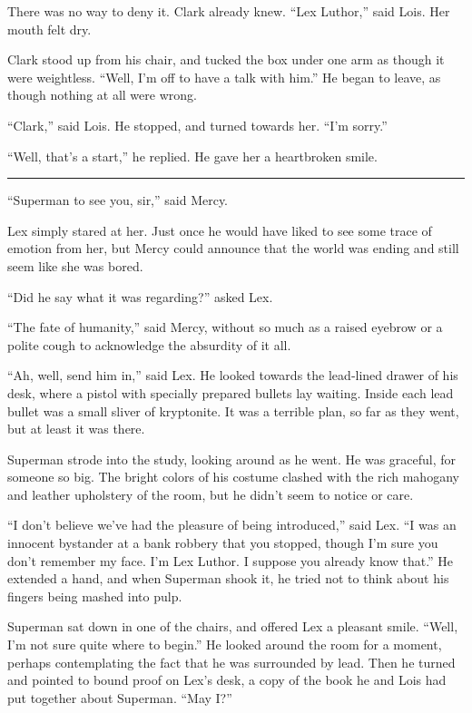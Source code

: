 There was no way to deny it. Clark already knew. ``Lex Luthor,'' said
Lois. Her mouth felt dry.

Clark stood up from his chair, and tucked the box under one arm as
though it were weightless. ``Well, I'm off to have a talk with him.'' He
began to leave, as though nothing at all were wrong.

``Clark,'' said Lois. He stopped, and turned towards her. ``I'm sorry.''

``Well, that's a start,'' he replied. He gave her a heartbroken smile.

\begin{center}\rule{0.5\linewidth}{\linethickness}\end{center}

``Superman to see you, sir,'' said Mercy.

Lex simply stared at her. Just once he would have liked to see some
trace of emotion from her, but Mercy could announce that the world was
ending and still seem like she was bored.

``Did he say what it was regarding?'' asked Lex.

``The fate of humanity,'' said Mercy, without so much as a raised
eyebrow or a polite cough to acknowledge the absurdity of it all.

``Ah, well, send him in,'' said Lex. He looked towards the lead‐lined
drawer of his desk, where a pistol with specially prepared bullets lay
waiting. Inside each lead bullet was a small sliver of kryptonite. It
was a terrible plan, so far as they went, but at least it was there.

Superman strode into the study, looking around as he went. He was
graceful, for someone so big. The bright colors of his costume clashed
with the rich mahogany and leather upholstery of the room, but he didn't
seem to notice or care.

``I don't believe we've had the pleasure of being introduced,'' said
Lex. ``I was an innocent bystander at a bank robbery that you stopped,
though I'm sure you don't remember my face. I'm Lex Luthor. I suppose
you already know that.'' He extended a hand, and when Superman shook it,
he tried not to think about his fingers being mashed into pulp.

Superman sat down in one of the chairs, and offered Lex a pleasant
smile. ``Well, I'm not sure quite where to begin.'' He looked around the
room for a moment, perhaps contemplating the fact that he was surrounded
by lead. Then he turned and pointed to bound proof on Lex's desk, a copy
of the book he and Lois had put together about Superman. ``May I?''

